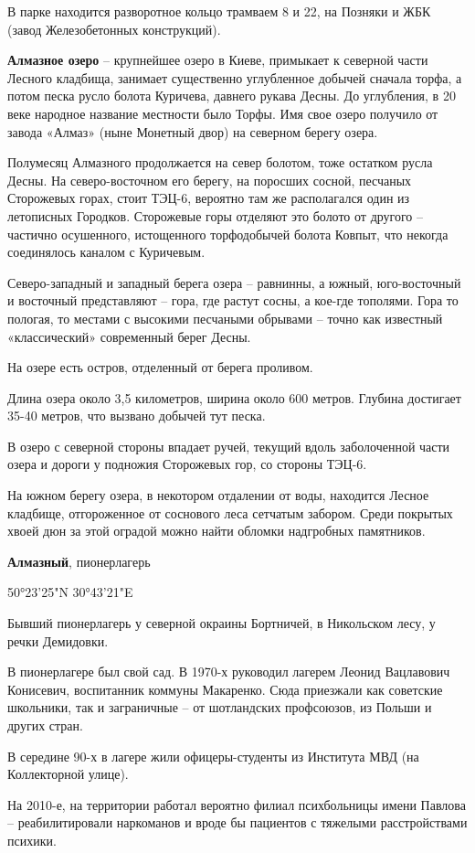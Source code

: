 В парке находится разворотное кольцо трамваем 8 и 22, на Позняки и ЖБК (завод Железобетонных конструкций).\\

\medskip

\textbf{Алмазное озеро} – крупнейшее озеро в Киеве, примыкает к северной части Лесного кладбища, занимает существенно углубленное добычей сначала торфа, а потом песка русло болота Куричева, давнего рукава Десны. До углубления, в 20 веке народное название местности было Торфы. Имя свое озеро получило от завода «Алмаз» (ныне Монетный двор) на северном берегу озера.

Полумесяц Алмазного продолжается на север болотом, тоже остатком русла Десны. На северо-восточном его берегу, на поросших сосной, песчаных Сторожевых горах, стоит ТЭЦ-6, вероятно там же располагался один из летописных Городков. Сторожевые горы отделяют это болото от другого – частично осушенного, истощенного торфодобычей болота Ковпыт, что некогда соединялось каналом с Куричевым.

Северо-западный и западный берега озера – равнинны, а южный, юго-восточный и восточный представляют – гора, где растут сосны, а кое-где тополями. Гора то пологая, то местами с высокими песчаными обрывами – точно как известный «классический» современный берег Десны. 

На озере есть остров, отделенный от берега проливом.

Длина озера около 3,5 километров, ширина около 600 метров. Глубина достигает 35-40 метров, что вызвано добычей тут песка.

В озеро с северной стороны впадает ручей, текущий вдоль заболоченной части озера и дороги у подножия Сторожевых гор, со стороны ТЭЦ-6.

На южном берегу озера, в некотором отдалении от воды, находится Лесное кладбище, отгороженное от соснового леса сетчатым забором. Среди покрытых хвоей дюн за этой оградой можно найти обломки надгробных памятников.\\

\medskip


\textbf{Алмазный}, пионерлагерь

50°23'25"N 30°43'21"E

Бывший пионерлагерь у северной окраины Бортничей, в Никольском лесу, у речки Демидовки.

В пионерлагере был свой сад. В 1970-х руководил лагерем Леонид Вацлавович Конисевич, воспитанник коммуны Макаренко. Сюда приезжали как советские школьники, так и заграничные – от шотландских профсоюзов, из Польши и других стран.

В середине 90-х в лагере жили офицеры-студенты из Института МВД (на Коллекторной улице).

На 2010-е, на территории работал вероятно филиал психбольницы имени Павлова – реабилитировали наркоманов и вроде бы пациентов с тяжелыми расстройствами психики.
